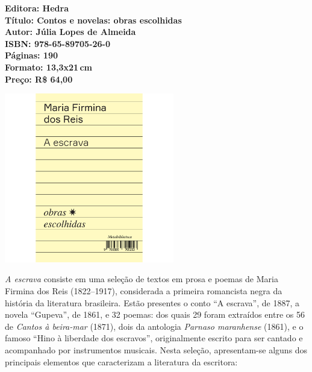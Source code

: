 \vfill
\noindent\begin{minipage}[c]{1\linewidth}
{\small\textbf{
\hspace*{-.1cm}Editora: Hedra\\
Título: Contos e novelas: obras escolhidas\\
Autor: Júlia Lopes de Almeida\\ 
ISBN: 978-65-89705-26-0\\
Páginas: 190\\
Formato: 13,3x21\,cm\\
Preço: R\$ 64,00\\
}}
\end{minipage}
\pagebreak

\begin{center}
\hspace*{.5cm}\includegraphics[width=74mm]{./CAPAS/HEDRA_FIRMINA.jpg}
\end{center}
\hspace*{-7cm}\hrulefill\hspace*{-7cm}
\medskip

\noindent{}\textit{A escrava} consiste em uma seleção de textos em prosa e poemas de Maria Firmina dos Reis (1822–1917), considerada a primeira romancista negra da história da literatura brasileira. Estão presentes o conto ``A escrava'', de 1887, a novela ``Gupeva'', de 1861, e 32 poemas: dos quais 29 foram extraídos entre os 56 de \textit{Cantos à beira-mar} (1871), dois da antologia \textit{Parnaso maranhense} (1861), e o famoso ``Hino à liberdade dos escravos'', originalmente escrito para ser cantado e acompanhado por instrumentos musicais. Nesta seleção, apresentam-se alguns dos principais elementos que caracterizam a literatura da escritora: 

